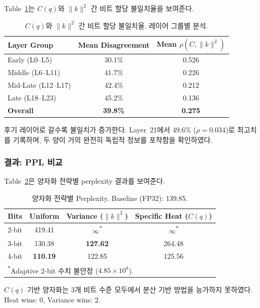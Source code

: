 \documentclass[11pt,a4paper]{article}
\begin{document}
Table~\ref{tab:disagree}는 $C(q)$와 $\|k\|^2$ 간 비트 할당 불일치율을 보여준다.

\begin{table}[H]
\centering
\caption{$C(q)$와 $\|k\|^2$ 간 비트 할당 불일치율. 레이어 그룹별 분석.}
\label{tab:disagree}
\begin{tabular}{lcc}
\toprule
\textbf{Layer Group} & \textbf{Mean Disagreement} & \textbf{Mean $\rho(C, \|k\|^2)$} \\
\midrule
Early (L0--L5) & 30.1\% & 0.526 \\
Middle (L6--L11) & 41.7\% & 0.226 \\
Mid-Late (L12--L17) & 42.4\% & 0.212 \\
Late (L18--L23) & 45.2\% & 0.136 \\
\midrule
\textbf{Overall} & \textbf{39.8\%} & \textbf{0.275} \\
\bottomrule
\end{tabular}
\end{table}

후기 레이어로 갈수록 불일치가 증가한다.
Layer~21에서 49.6\% ($\rho = 0.034$)로 최고치를 기록하며, 두 양이 거의 완전히 독립적 정보를 포착함을 확인하였다.

\subsubsection{결과: PPL 비교}

Table~\ref{tab:ppl}은 양자화 전략별 perplexity 결과를 보여준다.

\begin{table}[H]
\centering
\caption{양자화 전략별 Perplexity. Baseline (FP32): 139.85.}
\label{tab:ppl}
\begin{tabular}{lccc}
\toprule
\textbf{Bits} & \textbf{Uniform} & \textbf{Variance ($\|k\|^2$)} & \textbf{Specific Heat ($C(q)$)} \\
\midrule
2-bit & 419.41 & $\infty$\textsuperscript{*} & $\infty$\textsuperscript{*} \\
3-bit & 130.38 & \textbf{127.62} & 264.48 \\
4-bit & \textbf{110.19} & 122.85 & 125.56 \\
\bottomrule
\multicolumn{4}{l}{\footnotesize \textsuperscript{*}Adaptive 2-bit 수치 불안정 ($4.85 \times 10^8$).} \\
\end{tabular}
\end{table}

$C(q)$ 기반 양자화는 3개 비트 수준 모두에서 분산 기반 방법을 능가하지 못하였다.
Heat wins: 0, Variance wins: 2.
\end{document}
